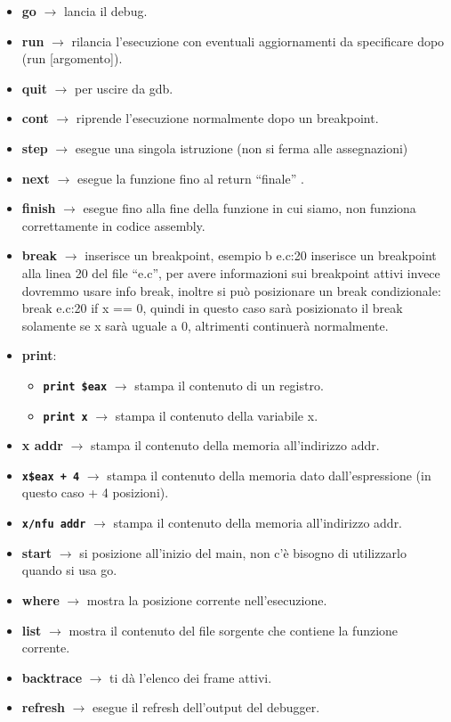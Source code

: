 \begin{itemize}
    \item \textbf{go} $\xrightarrow{}$ lancia il debug.
    \item \textbf{run} $\xrightarrow{}$ rilancia l’esecuzione con eventuali aggiornamenti da specificare dopo (run [argomento]).
    \item \textbf{quit} $\xrightarrow{}$ per uscire da gdb.
    \item \textbf{cont} $\xrightarrow{}$ riprende l’esecuzione normalmente dopo un breakpoint.
    \item \textbf{step} $\xrightarrow{}$ esegue una singola istruzione (non si ferma alle assegnazioni)
    \item \textbf{next} $\xrightarrow{}$ esegue la funzione fino al return “finale” .
    \item \textbf{finish} $\xrightarrow{}$ esegue fino alla fine della funzione in cui siamo, non funziona correttamente in codice assembly.
    \item \textbf{break} $\xrightarrow{}$ inserisce un breakpoint, esempio b e.c:20  inserisce un breakpoint alla linea 20 del file “e.c”, per avere informazioni sui breakpoint attivi invece dovremmo usare info break, inoltre si può posizionare un break condizionale: break e.c:20 if x == 0, quindi in questo caso sarà posizionato il break solamente se x sarà uguale a 0, altrimenti continuerà normalmente.
    \item \textbf{print}:
        \begin{itemize}
            \item \textbf{\texttt{print \$eax}} $\xrightarrow{}$ stampa il contenuto di un registro.
            \item \textbf{\texttt{print x}} $\xrightarrow{}$ stampa il contenuto della variabile x.
        \end{itemize}
    \item \textbf{x addr} $\xrightarrow{}$ stampa il contenuto della memoria all’indirizzo addr.
    \item \textbf{\texttt{x\$eax + 4}} $\rightarrow$ stampa il contenuto della memoria dato dall’espressione (in questo caso + 4 posizioni).
    \item \textbf{\texttt{x/nfu addr}} $\rightarrow$ stampa il contenuto della memoria all’indirizzo addr.
    \item \textbf{start} $\xrightarrow{}$ si posizione all’inizio del main, non c’è bisogno di utilizzarlo quando si usa go.
    \item \textbf{where} $\xrightarrow{}$ mostra la posizione corrente nell’esecuzione.
    \item \textbf{list} $\xrightarrow{}$ mostra il contenuto del file sorgente che contiene la funzione corrente.
    \item \textbf{backtrace} $\xrightarrow{}$ ti dà l’elenco dei frame attivi.
    \item \textbf{refresh} $\xrightarrow{}$ esegue il refresh dell’output del debugger.
\end{itemize}

